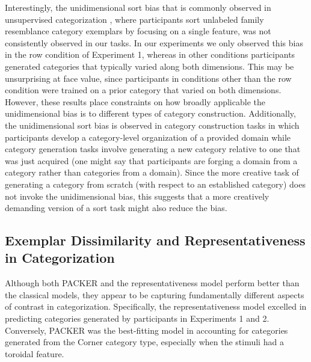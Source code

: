 \documentclass[pdflatex,sn-apa]{sn-jnl}%
\theoremstyle{thmstyleone}%
\theoremstyle{thmstyletwo}%
\theoremstyle{thmstylethree}%
\begin{document}
Interestingly, the unidimensional sort bias that is commonly observed in
unsupervised categorization
\citep{imai1965discriminability,milton2004influence,ahn1992two}, where
participants sort unlabeled family resemblance category exemplars by focusing
on a single feature, was not consistently observed in our tasks. In our
experiments we only observed this bias in the row condition of Experiment 1,
whereas in other conditions participants generated categories that typically
varied along both dimensions. This may be unsurprising at face value, since
participants in conditions other than the row condition were trained on a prior
category that varied on both dimensions. However, these results place constraints on how broadly applicable the 
unidimensional bias is to different types of category construction. Additionally, the
unidimensional sort bias is observed in category construction tasks in which
participants develop a category-level organization of a provided domain while
category generation tasks involve generating a new category relative to one that
was just acquired (one might say that participants are forging a domain from a
category rather than categories from a domain). Since the more creative task of
generating a category from scratch (with respect to an established category)
does not invoke the unidimensional bias, this suggests that a more creatively
demanding version of a sort task might also reduce the bias.

\subsection{Exemplar Dissimilarity and Representativeness in Categorization} 
Although both PACKER and the representativeness model perform better than the
classical models, they appear to be capturing fundamentally different aspects of
contrast in categorization. Specifically, the representativeness model excelled
in predicting categories generated by participants in Experiments 1 and 2.
Conversely, PACKER was the best-fitting model in accounting for categories
generated from the Corner category type, especially when the stimuli had a
toroidal feature.

\end{document}
